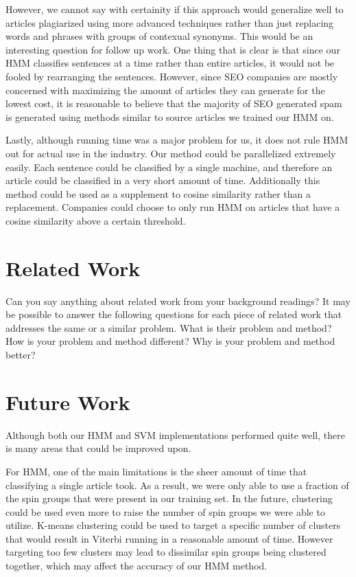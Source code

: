 \documentclass[11pt,letterpaper,oneside, titlepage]{scrartcl}
\begin{document}
However, we cannot say with certainity if this approach would generalize well to articles plagiarized using more advanced techniques rather than just replacing words and phrases with groups of contexual synonyms. This would be an interesting question for follow up work. One thing that is clear is that since our HMM classifies sentences at a time rather than entire articles, it would not be fooled by rearranging the sentences. However, since SEO companies are mostly concerned with maximizing the amount of articles they can generate for the lowest cost, it is reasonable to believe that the majority of SEO generated spam is generated using methods similar to source articles we trained our HMM on.

Lastly, although running time was a major problem for us, it does not rule HMM out for actual use in the industry. Our method could be parallelized extremely easily. Each sentence could be classified by a single machine, and therefore an article could be classified in a very short amount of time. Additionally this method could be used as a supplement to cosine similarity rather than a replacement. Companies could choose to only run HMM on articles that have a cosine similarity above a certain threshold.
\section{Related Work}

Can you say anything about related work from your background readings? It may be possible to answer the following questions for each piece of related work that addresses the same or a similar problem. What is their problem and method? How is your problem and method different? Why is your problem and method better? 

\section{Future Work}
Although both our HMM and SVM implementations performed quite well, there is many areas that could be improved upon.

For HMM, one of the main limitations is the sheer amount of time that classifying a single article took. As a result, we were only able to use a fraction of the spin groups that were present in our training set. In the future, clustering could be used even more to raise the number of spin groups we were able to utilize. K-means clustering could be used to target a specific number of clusters that would result in Viterbi running in a reasonable amount of time. However targeting too few clusters may lead to dissimilar spin groups being clustered together, which may affect the accuracy of our HMM method.
\end{document}
